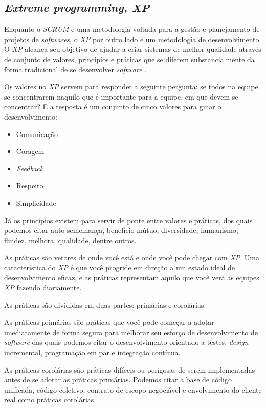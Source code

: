 \documentclass[
	12pt,				%
	openright,			%
	oneside,			%
	a4paper,			%
	english,			%
	french,				%
	spanish,			%
	brazil,				%
	]{abntex2}
\begin{document}
\subsection{\textit{Extreme programming, XP}}

Enquanto o \textit{SCRUM} é uma metodologia voltada para a gestão e planejamento de projetos de \textit{softwares}, o \textit{XP} por outro lado é um metodologia de desenvolvimento. O \textit{XP} alcança seu objetivo de ajudar a criar sistemas de melhor qualidade através de conjunto de valores, princípios e práticas que se diferem substancialmente da forma tradicional de se desenvolver \textit{software} \cite{Agil:XP}.

Os valores no \textit{XP} servem para responder a seguinte pergunta: se todos na equipe se concentrarem naquilo que é importante para a equipe, em que devem se concentrar? E a resposta é um conjunto de cinco valores para guiar o desenvolvimento:

\begin{itemize}
	\item Comunicação
	\item Coragem
	\item \textit{Feedback}
	\item Respeito
	\item Simplicidade
\end{itemize}

Já os princípios existem para servir de ponte entre valores e práticas, dos quais podemos citar auto-semelhança, benefício mútuo, diversidade, humanismo, fluidez, melhora, qualidade, dentre outros.

As práticas são vetores de onde você está e onde você pode chegar com \textit{XP}. Uma característica do \textit{XP} é que você progride em direção a um estado ideal de desenvolvimento eficaz, e as práticas representam aquilo que você verá as equipes \textit{XP} fazendo diariamente.

As práticas são divididas em duas partes: primárias e corolárias. 

As práticas primárias são práticas que você pode começar a adotar imediatamente de forma segura para melhorar seu esforço de desenvolvimento de \textit{software} das quais podemos citar o desenvolvimento orientado a testes, \textit{design} incremental, programação em par e integração contínua.

As práticas corolárias são práticas difíceis ou perigosas de serem implementadas antes de se adotar as práticas primárias. Podemos citar a base de código unificada, código coletivo, contrato de escopo negociável e envolvimento do cliente real como práticas corolárias.
\end{document}
